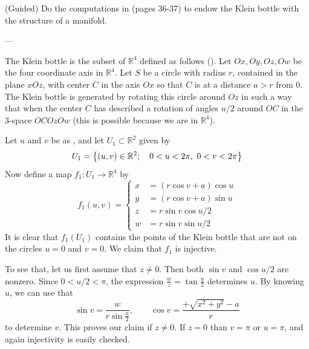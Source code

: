 \documentclass[../main.tex]{subfiles}
\begin{document}
\begin{exercise}
(Guided) Do the computations in  (pages 36-37) to endow the Klein bottle with the structure of a manifold.


---

The Klein bottle is the subset of $\mathbb{R}^4$ defined as follows (). Let $Ox,Oy,Oz,Ow$ be the four coordinate axis in $\mathbb{R}^4$. Let $S$ be a circle with radius $r$, contained in the plane $xOz$, with center $C$ in the axis $Ox$ so that $C$ is at a distance $a>r$ from 0. The Klein bottle is generated by rotating this circle around $Oz$ in such a way that when the center $C$ has described a rotation of angles $u/2$ around $OC$ in the 3-space $OCOzOw$ (this is possible because we are in $\mathbb{R}^4$).

Let $u$ and $v$ be as , and let $U_1\subset \mathbb{R}^2$ given by
\[
U_1=\Bqty{(u,v) \in \mathbb{R}^2; \quad 0<u<2\pi, \ 0<v<2\pi}
\]
Now define a map $f_1:U_1\to\mathbb{R}^4$ by
\[
f_1(u,v)=
\begin{cases}
x&=(r\cos v + a ) \cos u\\
y&=(r\cos v + a ) \sin u\\
z&=r\sin v \cos u/2\\
w&=r\sin v \sin u/2
\end{cases}
\]
It is clear that $f_1(U_1)$ contains the points of the Klein bottle that are not on the circles $u=0$ and $v=0$. We claim that $f_1$ is injective.

To see that, let us first assume that $z\neq 0$. Then both $\sin v$ and $\cos u/2$ are nonzero. Since $0<u/2<\pi$, the expression $\frac{w}{z}=\tan\frac{u}{2}$ determines $u$. By knowing $u$, we can use that
\[
\sin v = \frac{w}{r\sin\frac{u}{2}}, \qquad \cos v = \frac{+\sqrt{x^2+y^2}-a}{r}
\]
to determine $v$. This proves our claim if $z\neq 0$. If $z=0$ than $v=\pi$ or $u=\pi$, and again injectivity is easily checked.


\end{exercise}
\end{document}

